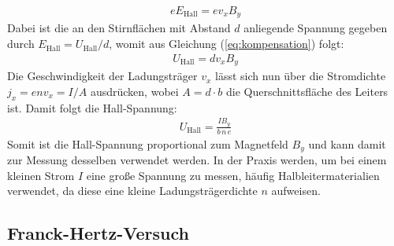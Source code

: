 \documentclass[11pt, a4paper]{article}
\begin{document}
\begin{align}
	e E_\mathrm{Hall} = e v_x B_y
	\label{eq:kompensation}
\end{align}
Dabei ist die an den Stirnflächen mit Abstand $d$ anliegende Spannung gegeben durch $E_\mathrm{Hall} = U_\mathrm{Hall} / d$, womit aus Gleichung (\ref{eq:kompensation}) folgt:
\begin{align*}
	U_\mathrm{Hall} = d v_x B_y
\end{align*}
Die Geschwindigkeit der Ladungsträger $v_x$ lässt sich nun über die Stromdichte $j_x = e n v_x = I/A$ ausdrücken, wobei $A = d \cdot b$ die Querschnittsfläche des Leiters ist.
Damit folgt die Hall-Spannung:
\begin{align*}
	U_\mathrm{Hall} = \frac{I B_y}{b\, n\, e}
\end{align*}
Somit ist die Hall-Spannung proportional zum Magnetfeld $B_y$ und kann damit zur Messung desselben verwendet werden.
In der Praxis werden, um bei einem kleinen Strom $I$ eine große Spannung zu messen, häufig Halbleitermaterialien verwendet, da diese eine kleine Ladungsträgerdichte $n$ aufweisen.


\subsection{Franck-Hertz-Versuch}
\end{document}
